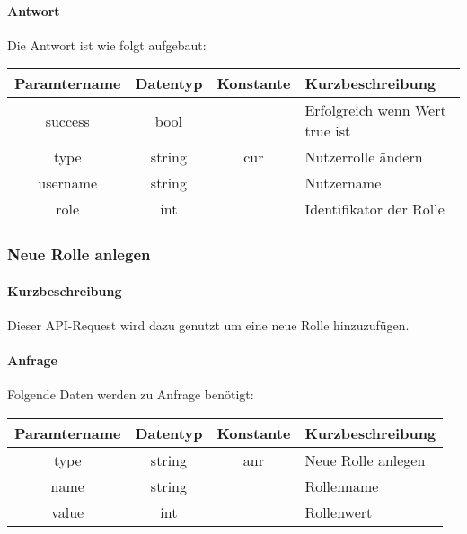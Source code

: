 \paragraph{Antwort}Die Antwort ist wie folgt aufgebaut:
\begin{table}[H]
	\begin{tabular}{|c|c|c|p{6.5cm}|}
		\hline
		\textbf{Paramtername} & \textbf{Datentyp} & \textbf{Konstante} & \textbf{Kurzbeschreibung}            \\ \hline                
		success             & bool             &                 & Erfolgreich wenn Wert {\glqq true\grqq} ist \\ \hline
		type                & string           & cur             & Nutzerrolle ändern \\ \hline
		username            & string           &                 & Nutzername \\ \hline
		role                & int              &                 & Identifikator der Rolle \\ \hline
	\end{tabular}
\end{table}
\subsubsection{Neue Rolle anlegen}
\paragraph{Kurzbeschreibung}Dieser API-Request wird dazu genutzt um eine neue Rolle hinzuzufügen.
\paragraph{Anfrage}Folgende Daten werden zu Anfrage benötigt:
\begin{table}[H]
	\begin{tabular}{|c|c|c|p{6.5cm}|}
		\hline
		\textbf{Paramtername} & \textbf{Datentyp} & \textbf{Konstante} & \textbf{Kurzbeschreibung}                                                                                               \\ \hline
		type                & string            & anr                & Neue Rolle anlegen \\ \hline
		name                & string            &                    & Rollenname \\ \hline
		value               & int               &                    & Rollenwert \\ \hline
	\end{tabular}
\end{table}
